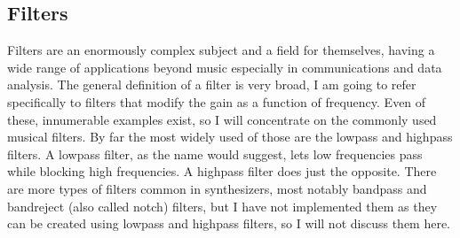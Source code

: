 \documentclass[11pt,a4paper]{article}
\begin{document}
\subsection{Filters}

Filters are an enormously complex subject and a field for themselves, having a wide range of applications beyond music especially in communications and data analysis. The general definition of a filter is very broad, I am going to refer specifically to filters that modify the gain as a function of frequency.
Even of these, innumerable examples exist, so I will concentrate on the commonly used musical filters. By far the most widely used of those are the lowpass and highpass filters.
A lowpass filter, as the name would suggest, lets low frequencies pass while blocking high frequencies. A highpass filter does just the opposite.
There are more types of filters common in synthesizers, most notably bandpass and bandreject (also called notch) filters, but I have not implemented them as they can be created using lowpass and highpass filters, so I will not discuss them here.
\end{document}
